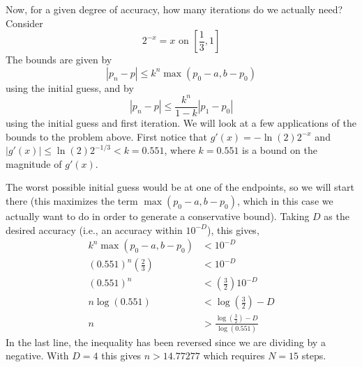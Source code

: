 \documentclass[11pt]{article}
\begin{document}

Now, for a given degree of accuracy, how many iterations do we actually need?  Consider \[2^{-x}=x\text{ on }\left[\frac{1}{3}, 1\right]\] The bounds are given by \[|p_n-p|\leq k^n \max(p_0-a, b - p_0)\]
using the initial guess, and by \[|p_n-p|\leq\frac{k^n}{1-k}|p_1-p_0|\] using the initial guess and first iteration.  We will look at a few applications of the bounds to the problem above.  First notice that \(g'(x) = -\ln(2)2^{-x}\) and \(|g'(x)| \leq \ln(2)2^{-{1}/{3}} < k = 0.551\), where \(k = 0.551\) is a bound on the magnitude of \(g'(x)\).

The worst possible initial guess would be at one of the endpoints, so we will start there (this maximizes the term \( \max(p_0-a, b - p_0)\), which in this case we actually want to do in order to generate a conservative bound).  Taking \(D\) as the desired accuracy (i.e., an accuracy within \(10^{-D}\)), this gives, 
\begin{align*}
k^n \max(p_0-a, b - p_0) & < 10^{-D}\\
(0.551)^n \left(\frac{2}{3}\right) & < 10^{-D}\\
(0.551)^n  & < \left(\frac{3}{2}\right)10^{-D}\\
n \log(0.551) & < \log\left(\frac{3}{2}\right) - D\\
n  & > \frac{\log\left(\frac{3}{2}\right) - D}{\log(0.551)}
\end{align*}
In the last line, the inequality has been reversed since we are dividing by a negative.  With \(D=4\) this gives \(n > 14.77277\) which requires \(N=15\) steps.
\end{document}
